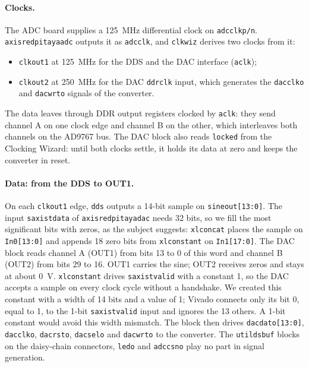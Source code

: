 \documentclass[11pt,a4paper]{article}
\renewcommand{\_}{\oldunderscore\allowbreak}
\begin{document}
\paragraph{Clocks.} The ADC board supplies a \SI{125}{\mega\hertz} differential clock on
\texttt{adc\_clk\_p/n}. \texttt{axis\_red\_pitaya\_adc\_0} outputs it as
\texttt{adc\_clk}, and \texttt{clk\_wiz\_0} derives two clocks from it:
\begin{itemize}
  \item \texttt{clk\_out1} at \SI{125}{\mega\hertz} for the DDS and the DAC interface
        (\texttt{aclk});
  \item \texttt{clk\_out2} at \SI{250}{\mega\hertz} for the DAC \texttt{ddr\_clk}
        input, which generates the \texttt{dac\_clk\_o} and \texttt{dac\_wrt\_o}
        signals of the converter.
\end{itemize}
The data leaves through DDR output registers clocked by \texttt{aclk}: they send
channel A on one clock edge and channel B on the other, which interleaves both
channels on the AD9767 bus. The DAC block also reads \texttt{locked} from the Clocking
Wizard: until both clocks settle, it holds its data at zero and keeps the converter
in reset.

\paragraph{Data: from the DDS to OUT1.} On each \texttt{clk\_out1} edge,
\texttt{dds\_0} outputs a 14-bit sample on \texttt{sine\_out[13:0]}.
The input \texttt{s\_axis\_tdata} of \texttt{axis\_red\_pitaya\_dac\_0} needs 32 bits,
so we fill the most significant bits with zeros, as the subject suggests:
\texttt{xlconcat\_0} places the sample on \texttt{In0[13:0]} and appends 18 zero bits
from \texttt{xlconstant\_1} on \texttt{In1[17:0]}. The DAC block reads channel A (OUT1)
from bits 13 to 0 of this word and channel B (OUT2) from bits 29 to 16. OUT1 carries
the sine; OUT2 receives zeros and stays at about \SI{0}{\volt}. \texttt{xlconstant\_0}
drives \texttt{s\_axis\_tvalid} with a constant 1, so the DAC accepts a sample on
every clock cycle without a handshake. We created this constant with a width of 14
bits and a value of 1; Vivado connects only its bit 0, equal to 1, to the 1-bit
\texttt{s\_axis\_tvalid} input and ignores the 13 others. A 1-bit constant would
avoid this width mismatch. The block then drives
\texttt{dac\_dat\_o[13:0]}, \texttt{dac\_clk\_o}, \texttt{dac\_rst\_o},
\texttt{dac\_sel\_o} and \texttt{dac\_wrt\_o} to the converter. The
\texttt{util\_ds\_buf} blocks on the daisy-chain connectors, \texttt{led\_o} and
\texttt{adc\_csn\_o} play no part in signal generation.
\end{document}
